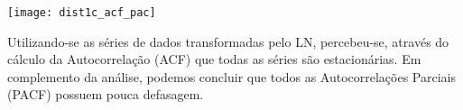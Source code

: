 \begin{center}
\begin{centering}
\texttt{[image: dist1c\_acf\_pac]}
\par\end{centering}
\par\end{center}

Utilizando-se as séries de dados transformadas pelo LN, percebeu-se, através do cálculo da Autocorrelação (ACF) que todas as séries são estacionárias. Em complemento da análise, podemos concluir que todos as Autocorrelações Parciais (PACF) possuem pouca defasagem.
